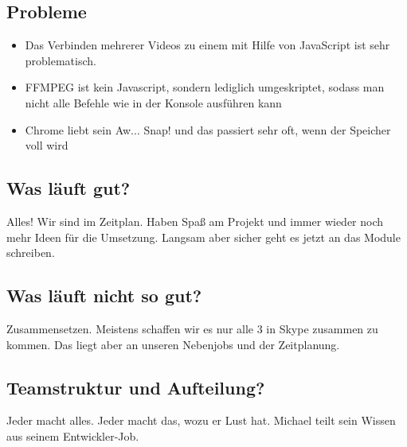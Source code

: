 \documentclass[a4paper,10pt]{scrartcl}
\begin{document}
\subsection{Probleme}
\begin{itemize}
	\item Das Verbinden mehrerer Videos zu einem mit Hilfe von JavaScript ist sehr problematisch.
	\item FFMPEG ist kein Javascript, sondern lediglich umgeskriptet, sodass man nicht alle Befehle wie in der Konsole ausführen kann
	\item Chrome liebt sein Aw... Snap! und das passiert sehr oft, wenn der Speicher voll wird
	\end{itemize}
\subsection{Was läuft gut?}
Alles! Wir sind im Zeitplan. Haben Spaß am Projekt und immer wieder noch mehr Ideen für die Umsetzung. Langsam aber sicher geht es jetzt an das Module schreiben.
\subsection{Was läuft nicht so gut?}
Zusammensetzen. Meistens schaffen wir es nur alle 3 in Skype zusammen zu kommen. Das liegt aber an unseren Nebenjobs und der Zeitplanung.
\subsection{Teamstruktur und Aufteilung?}
Jeder macht alles. Jeder macht das, wozu er Lust hat. Michael teilt sein Wissen aus seinem Entwickler-Job.
\newpage
\end{document}
